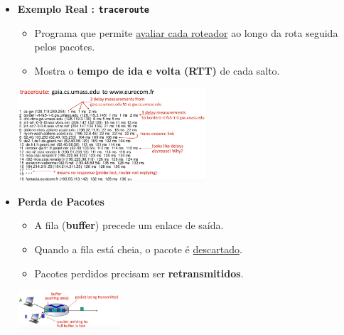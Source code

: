         \begin{itemize}[left=0.5cm, align=left, nosep]
            
            \item \textbf{Exemplo Real : \texttt{traceroute}}
            \begin{itemize}[left=0.5cm, nosep, label=$\hookrightarrow$]
                \item Programa que permite \underline{avaliar cada roteador} ao longo da rota seguida pelos pacotes.
                \item Mostra o \textbf{tempo de ida e volta (RTT)} de cada salto.  
            \end{itemize}
        
            \begin{center}
                \includegraphics[width=0.55\textwidth]{img/cap-01/traceroute-exemplo.png}
            \end{center}
        
            \item \textbf{Perda de Pacotes}
            \begin{itemize}[left=0.5cm, nosep, label=$\hookrightarrow$]
                \item A fila (\textbf{buffer}) precede um enlace de saída.
                \item Quando a fila está cheia, o pacote é \underline{descartado}.
                \item Pacotes perdidos precisam ser \textbf{retransmitidos}.
            \end{itemize}

            \begin{center}
                \includegraphics[width=0.3\textwidth]{img/cap-01/perda-de-pacotes.png}
            \end{center}
            

\end{itemize}
